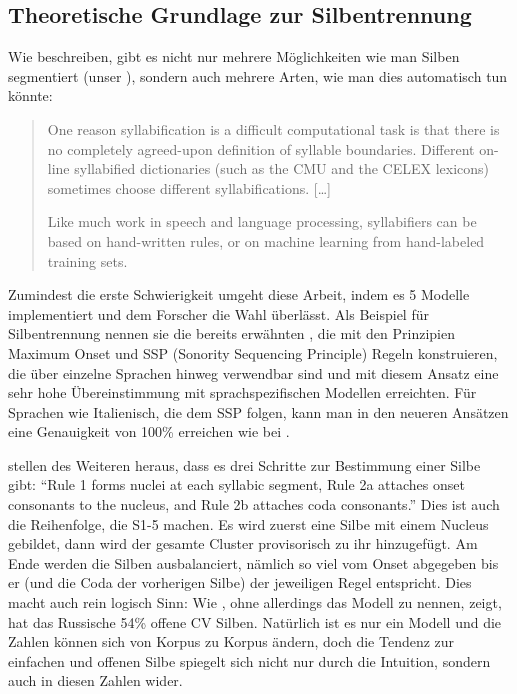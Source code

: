 \documentclass[12pt,headsepline,a4paper]{scrartcl}
\begin{document}

\subsection{Theoretische Grundlage zur Silbentrennung}
Wie \textcite[406]{jurafsky2008} beschreiben, gibt es nicht nur mehrere Möglichkeiten wie man Silben segmentiert (unser ), sondern auch mehrere Arten, wie man dies automatisch tun könnte:
\begin{quotation}
One reason syllabification is a difficult computational task is that there is no completely
agreed-upon definition of syllable boundaries. Different on-line syllabified dictionaries
(such as the CMU and the CELEX lexicons) sometimes choose different syllabifications.
[\ldots]

Like much work in speech and language processing, syllabifiers can be based on
hand-written rules, or on machine learning from hand-labeled training sets.
\end{quotation}
Zumindest die erste Schwierigkeit umgeht diese Arbeit, indem es 5 Modelle implementiert und dem Forscher die Wahl überlässt.
Als Beispiel für Silbentrennung nennen sie die bereits erwähnten \textcite{goldwater2003}, die mit den Prinzipien Maximum Onset und SSP (Sonority Sequencing Principle) Regeln konstruieren, die über einzelne Sprachen hinweg verwendbar sind und mit diesem Ansatz eine sehr hohe Übereinstimmung mit sprachspezifischen Modellen erreichten.
Für Sprachen wie Italienisch, die dem SSP folgen, kann man in den neueren Ansätzen eine Genauigkeit von 100\% erreichen wie bei \textcite{iaco2011}.

\textcite[407]{jurafsky2008} stellen des Weiteren heraus, dass es drei Schritte zur Bestimmung einer Silbe gibt: "`Rule 1 forms nuclei at each syllabic segment, Rule 2a attaches onset consonants to the nucleus, and Rule 2b attaches coda consonants."'
Dies ist auch die Reihenfolge, die S1-5 machen. Es wird zuerst eine Silbe mit einem Nucleus gebildet, dann wird der gesamte Cluster provisorisch zu ihr hinzugefügt. Am Ende werden die Silben ausbalanciert, nämlich so viel vom Onset abgegeben bis er (und die Coda der vorherigen Silbe) der jeweiligen Regel entspricht.
Dies macht auch rein logisch Sinn: Wie \textcite[212]{bondarko1998}, ohne allerdings das Modell zu nennen, zeigt, hat das Russische 54\% offene CV Silben. Natürlich ist es nur ein Modell und die Zahlen können sich von Korpus zu Korpus ändern, doch die Tendenz zur einfachen und offenen Silbe spiegelt sich nicht nur durch die Intuition, sondern auch in diesen Zahlen wider.
\end{document}
